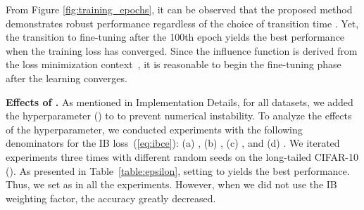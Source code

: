From Figure \ref{fig:training_epochs}, it can be observed that the proposed method demonstrates robust performance regardless of the choice of transition time .
Yet, the transition to fine-tuning after the 100th epoch yields the best performance when the training loss has converged.
Since the influence function is derived from the loss minimization context~\cite{ref:Koh_Liang_2017}, it is reasonable to begin the fine-tuning phase after the learning converges. 




\textbf{Effects of .}
As mentioned in Implementation Details, for all datasets, we added the hyperparameter () to  to prevent numerical instability.
To analyze the effects of the hyperparameter, we conducted experiments with the following denominators for the IB loss~(\ref{eq:ibce}):
(a) , (b) , (c) , and (d) . 
We iterated experiments three times with different random seeds on the long-tailed CIFAR-10 ().
As presented in Table~\ref{table:epsilon}, setting  to  yields the best performance.
Thus, we set   as  in all the experiments.
However, when we did not use the IB weighting factor, the accuracy greatly decreased.

\begin{table}[h]
\caption{Effects of .}
\centering
{}\vspace{-0.4cm}

\end{table}



